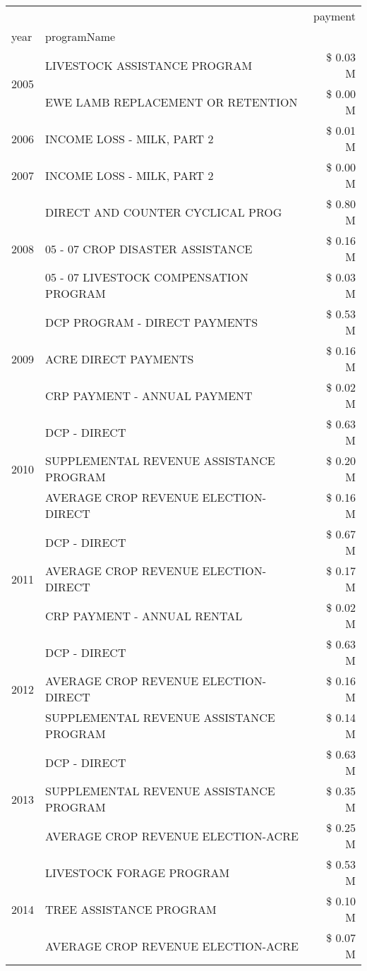 \begin{tabular}{llr}
\toprule
 &  & payment \\
year & programName &  \\
\midrule
\multirow[t]{2}{*}{2005} & LIVESTOCK ASSISTANCE PROGRAM & \$ 0.03 M \\
 & EWE LAMB REPLACEMENT OR RETENTION & \$ 0.00 M \\
\cline{1-3}
2006 & INCOME LOSS - MILK, PART 2 & \$ 0.01 M \\
\cline{1-3}
2007 & INCOME LOSS - MILK, PART 2 & \$ 0.00 M \\
\cline{1-3}
\multirow[t]{3}{*}{2008} & DIRECT AND COUNTER CYCLICAL PROG & \$ 0.80 M \\
 & 05 - 07 CROP DISASTER ASSISTANCE & \$ 0.16 M \\
 & 05 - 07 LIVESTOCK COMPENSATION PROGRAM & \$ 0.03 M \\
\cline{1-3}
\multirow[t]{3}{*}{2009} & DCP PROGRAM - DIRECT PAYMENTS & \$ 0.53 M \\
 & ACRE DIRECT PAYMENTS & \$ 0.16 M \\
 & CRP PAYMENT - ANNUAL PAYMENT & \$ 0.02 M \\
\cline{1-3}
\multirow[t]{3}{*}{2010} & DCP - DIRECT & \$ 0.63 M \\
 & SUPPLEMENTAL REVENUE ASSISTANCE PROGRAM & \$ 0.20 M \\
 & AVERAGE CROP REVENUE ELECTION-DIRECT & \$ 0.16 M \\
\cline{1-3}
\multirow[t]{3}{*}{2011} & DCP - DIRECT & \$ 0.67 M \\
 & AVERAGE CROP REVENUE ELECTION-DIRECT & \$ 0.17 M \\
 & CRP PAYMENT - ANNUAL RENTAL & \$ 0.02 M \\
\cline{1-3}
\multirow[t]{3}{*}{2012} & DCP - DIRECT & \$ 0.63 M \\
 & AVERAGE CROP REVENUE ELECTION-DIRECT & \$ 0.16 M \\
 & SUPPLEMENTAL REVENUE ASSISTANCE PROGRAM & \$ 0.14 M \\
\cline{1-3}
\multirow[t]{3}{*}{2013} & DCP - DIRECT & \$ 0.63 M \\
 & SUPPLEMENTAL REVENUE ASSISTANCE PROGRAM & \$ 0.35 M \\
 & AVERAGE CROP REVENUE ELECTION-ACRE & \$ 0.25 M \\
\cline{1-3}
\multirow[t]{3}{*}{2014} & LIVESTOCK FORAGE PROGRAM & \$ 0.53 M \\
 & TREE ASSISTANCE PROGRAM & \$ 0.10 M \\
 & AVERAGE CROP REVENUE ELECTION-ACRE & \$ 0.07 M \\

\end{tabular}

